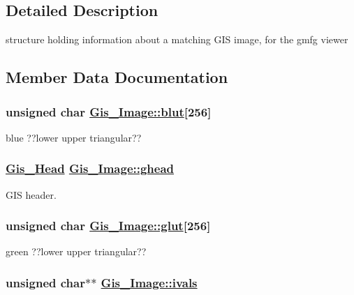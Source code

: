 \subsection{Detailed Description}
structure holding information about a matching GIS image, for the gmfg viewer 



\subsection{Member Data Documentation}
\hypertarget{structGis__Image_o4}{
\subsubsection[blut]{\setlength{\rightskip}{0pt plus 5cm}unsigned char \hyperlink{structGis__Image_o4}{Gis\_\-Image::blut}\mbox{[}256\mbox{]}}}
\label{structGis__Image_o4}


blue ??lower upper triangular?? 

\hypertarget{structGis__Image_o0}{
\subsubsection[ghead]{\setlength{\rightskip}{0pt plus 5cm}\hyperlink{structGis__Head}{Gis\_\-Head} \hyperlink{structGis__Image_o0}{Gis\_\-Image::ghead}}}
\label{structGis__Image_o0}


GIS header. 

\hypertarget{structGis__Image_o3}{
\subsubsection[glut]{\setlength{\rightskip}{0pt plus 5cm}unsigned char \hyperlink{structGis__Image_o3}{Gis\_\-Image::glut}\mbox{[}256\mbox{]}}}
\label{structGis__Image_o3}


green ??lower upper triangular?? 

\hypertarget{structGis__Image_o1}{
\subsubsection[ivals]{\setlength{\rightskip}{0pt plus 5cm}unsigned char$\ast$$\ast$ \hyperlink{structGis__Image_o1}{Gis\_\-Image::ivals}}}
\label{structGis__Image_o1}


